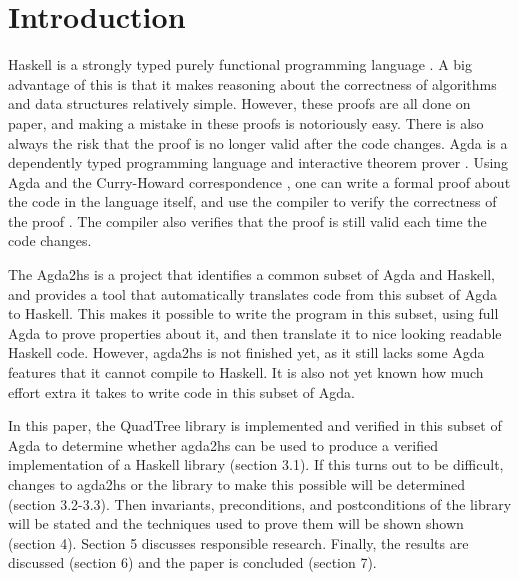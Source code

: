 \section{Introduction}
Haskell is a strongly typed purely functional programming language \cite{haskell}. A big advantage of this is that it makes reasoning about the correctness of algorithms and data structures relatively simple. However, these proofs are all done on paper, and making a mistake in these proofs is notoriously easy. There is also always the risk that the proof is no longer valid after the code changes. Agda is a dependently typed programming language and interactive theorem prover \cite{agda}.  Using Agda and the Curry-Howard correspondence \cite{chc}, one can write a formal proof about the code in the language itself, and use the compiler to verify the correctness of the proof \cite{schwaab, van}. The compiler also verifies that the proof is still valid each time the code changes.

The Agda2hs \cite{agda2hs} is a project that identifies a common subset of Agda and Haskell, and provides a tool that automatically translates code from this subset of Agda to Haskell. This makes it possible to write the program in this subset, using full Agda to prove properties about it, and then translate it to nice looking readable Haskell code. However, agda2hs is not finished yet, as it still lacks some Agda features that it cannot compile to Haskell. It is also not yet known how much effort extra it takes to write code in this subset of Agda.

In this paper, the QuadTree library is implemented and verified in this subset of Agda to determine whether agda2hs can be used to produce a verified implementation of a Haskell library (section 3.1). If this turns out to be difficult, changes to agda2hs or the library to make this possible will be determined (section 3.2-3.3). Then invariants, preconditions, and postconditions of the library will be stated and the techniques used to prove them will be shown shown (section 4). Section 5 discusses responsible research. Finally, the results are discussed (section 6) and the paper is concluded (section 7).
